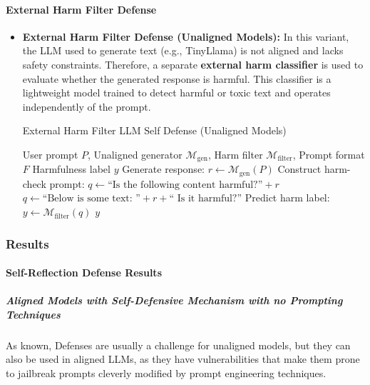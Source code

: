 \documentclass[../main.tex]{subfiles}
\begin{document}
\vspace{-1.2cm} %
\paragraph{External Harm Filter Defense}
\begin{itemize}
  \item \textbf{External Harm Filter Defense (Unaligned Models):} In this variant, the LLM used to generate text (e.g., TinyLlama) is not aligned and lacks safety constraints. Therefore, a separate \textbf{external harm classifier} is used to evaluate whether the generated response is harmful. This classifier is a lightweight model trained to detect harmful or toxic text and operates independently of the prompt.
  
\begin{breakablealgorithm}{External Harm Filter LLM Self Defense (Unaligned Models)}
\begin{algorithmic}[1]
\Require User prompt $P$, Unaligned generator $\mathcal{M}_{\text{gen}}$, Harm filter $\mathcal{M}_{\text{filter}}$, Prompt format $F$
\Ensure Harmfulness label $y$
\State Generate response: $r \gets \mathcal{M}_{\text{gen}}(P)$
\State Construct harm-check prompt:
    \State $q \gets \text{``Is the following content harmful?''} + r$
    \State $q \gets \text{``Below is some text: ''} + r + \text{`` Is it harmful?''}$
\EndIf
\State Predict harm label: $y \gets \mathcal{M}_{\text{filter}}(q)$
\State \Return $y$
\end{algorithmic}
\end{breakablealgorithm}
\end{itemize}

\clearpage
\subsubsection{Results}


\paragraph*{Self-Reflection Defense Results  }

\subparagraph*{ Aligned Models with Self-Defensive Mechanism with no Prompting Techniques }
As known, Defenses are usually a challenge for unaligned models, but they can also be used in aligned LLMs, as they have vulnerabilities that make them prone to jailbreak prompts cleverly modified by prompt engineering techniques.
\end{document}
